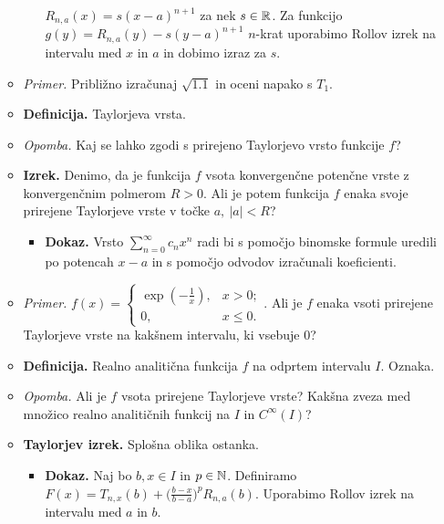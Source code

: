 \begin{enumerate}
\begin{itemize}
\begin{itemize}
            $R_{n,a}(x) = s(x-a)^{n+1}$ za nek $s \in \mathbb{R}$. Za funkcijo $g(y) = R_{n,a}(y) - s(y-a)^{n+1}$ $n$-krat uporabimo Rollov izrek na intervalu med $x$ in $a$ in dobimo izraz za $s$.
        \end{itemize} 
        \item \colorbox{yellow!30}{\emph{Primer.}} Približno izračunaj $\sqrt{1.1}$ in oceni napako s $T_1$.
        \item \colorbox{purple!30}{\textbf{Definicija.}} Taylorjeva vrsta.
        \item \colorbox{yellow!30}{\emph{Opomba.}} Kaj se lahko zgodi s prirejeno Taylorjevo vrsto funkcije $f$?
        \item \colorbox{blue!30}{\textbf{Izrek.}} Denimo, da je funkcija $f$ vsota konvergenčne potenčne vrste z konvergenčnim polmerom $R>0$. Ali je potem funkcija $f$ enaka svoje prirejene Taylorjeve vrste v točke $a, \ |a| < R$?
        \begin{itemize}
            \item \colorbox{green!30}{\textbf{Dokaz.}} Vrsto $\sum_{n=0}^{\infty}c_n x^n$ radi bi s pomočjo binomske formule uredili po potencah $x-a$ in s pomočjo odvodov izračunali koeficienti.
        \end{itemize} 
        \item \colorbox{yellow!30}{\emph{Primer.}} $f(x) = \begin{cases}
            \exp (-\frac{1}{x}), & x > 0; \\
            0, & x \leq 0.
        \end{cases}$. Ali je $f$ enaka vsoti prirejene Taylorjeve vrste na kakšnem intervalu, ki vsebuje $0$?
        \item \colorbox{purple!30}{\textbf{Definicija.}} Realno analitična funkcija $f$ na odprtem intervalu $I$. Oznaka.
        \item \colorbox{yellow!30}{\emph{Opomba.}} Ali je $f$ vsota prirejene Taylorjeve vrste? Kakšna zveza med množico realno analitičnih funkcij na $I$ in $C^{\infty}(I)$?
        \item \colorbox{blue!30}{\textbf{Taylorjev izrek.}} Splošna oblika ostanka.
        \begin{itemize}
            \item \colorbox{green!30}{\textbf{Dokaz.}} Naj bo $b, x \in I$ in $p \in \mathbb{N}$. Definiramo $F(x) = T_{n,x}(b) + \big(\frac{b-x}{b-a}\big)^p R_{n, a}(b)$. Uporabimo Rollov izrek na intervalu med $a$ in $b$.
        \end{itemize} 

\end{itemize}
\end{enumerate}
